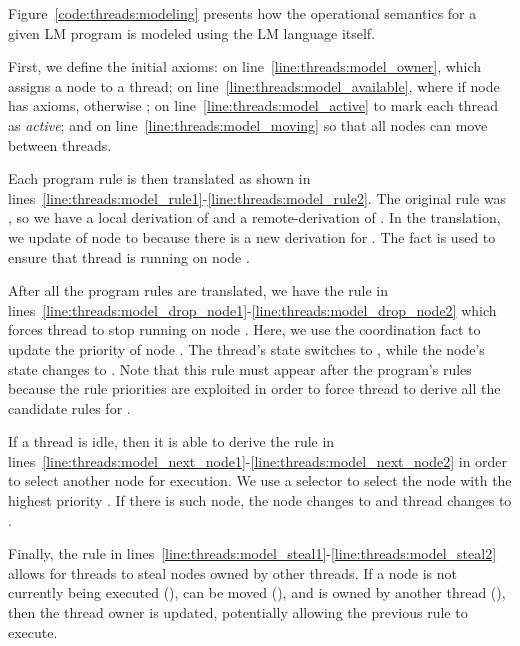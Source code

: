 Figure~\ref{code:threads:modeling} presents how the operational semantics for a
given LM program is modeled using the LM language itself.

First, we define the initial axioms:  on
line~\ref{line:threads:model_owner}, which assigns a node to a thread;
 on line~\ref{line:threads:model_available}, where
 if node  has axioms, otherwise ;
 on line~\ref{line:threads:model_active} to mark each thread as
\emph{active}; and  on line~\ref{line:threads:model_moving} so
that all nodes can move between threads.

Each program rule is then translated as shown in
lines~\ref{line:threads:model_rule1}-\ref{line:threads:model_rule2}. The
original rule was , so we have a local derivation of  and a
remote-derivation of . In the translation, we update
 of node  to  because there is a new
derivation for . The fact  is used to ensure that
thread  is running on node .

After all the program rules are translated, we have the rule in
lines~\ref{line:threads:model_drop_node1}-\ref{line:threads:model_drop_node2}
which forces thread  to stop running on node . Here, we use the
coordination fact  to update the priority of node
. The thread's state switches to , while the node's state
changes to . Note that this rule must appear after the
program's rules because the rule priorities are exploited in order to force
thread  to derive all the candidate rules for .

If a thread is idle, then it is able to derive the rule in
lines~\ref{line:threads:model_next_node1}-\ref{line:threads:model_next_node2} in
order to select another node for execution. We use a  selector to
select the node  with the highest priority . If there is such
node, the node changes to  and thread  changes to
.

Finally, the rule in
lines~\ref{line:threads:model_steal1}-\ref{line:threads:model_steal2} allows for
threads to steal nodes owned by other threads. If a node is not currently being
executed (), can be moved (), and is owned by
another thread  (), then the thread owner is
updated, potentially allowing the previous rule to execute.

